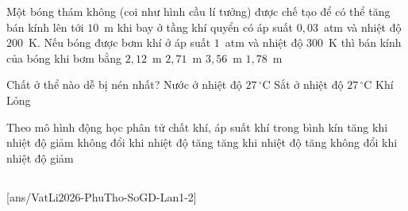 	\begin{ex}%
		Một bóng thám không (coi như hình cầu lí tưởng) được chế tạo để có thể tăng bán kính lên tới $10$~m khi bay ở tầng khí quyển có áp suất $0{,}03$~atm và nhiệt độ $200$~K. Nếu bóng được bơm khí ở áp suất $1$~atm và nhiệt độ $300$~K thì bán kính của bóng khi bơm bằng
		\choice
		{$2{,}12$~m}
		{$2{,}71$~m}
		{\True $3{,}56$~m}
		{$1{,}78$~m}
	\end{ex}

	\begin{ex}%
		Chất ở thể nào dễ bị nén nhất?
		\choice
		{Nước ở nhiệt độ $27\,^\circ\text{C}$}
		{Sắt ở nhiệt độ $27\,^\circ\text{C}$}
		{\True Khí}
		{Lỏng}
	\end{ex}

	\begin{ex}%
		Theo mô hình động học phân tử chất khí, áp suất khí trong bình kín
		\choice
		{tăng khi nhiệt độ giảm}
		{không đổi khi nhiệt độ tăng}
		{\True tăng khi nhiệt độ tăng}
		{không đổi khi nhiệt độ giảm}
	\end{ex}

	\subsection*{}
	\setcounter{ex}{0}
	[ans/VatLi2026-PhuTho-SoGD-Lan1-2]

